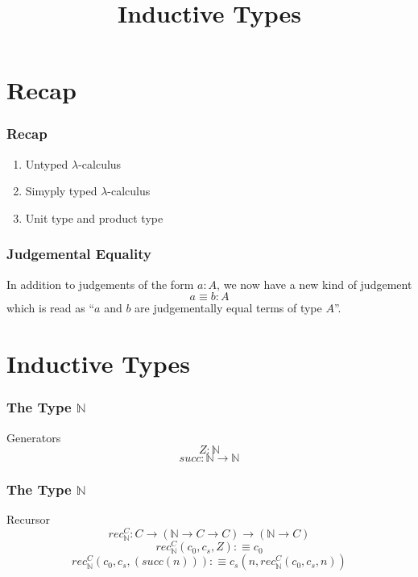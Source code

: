 \documentclass[14pt,compress]{beamer}
\title{Inductive Types}
\date{}
\newcommand{\N}{\mathbb{N}}
\begin{document}
\begin{frame}\label{frame : titlepage}
\titlepage
\end{frame}

\section{Recap}
\begin{frame}\label{frame : recap}
\frametitle{Recap}
\begin{enumerate}
\item Untyped $\lambda$-calculus
\item Simyply typed $\lambda$-calculus
\item Unit type and product type
\end{enumerate}
\end{frame}

\begin{frame}\label{frame : judgemental equality}
\frametitle{Judgemental Equality}

In addition to judgements of the form $a : A$, we now have a new kind of judgement
\textcolor{beamer@mathtext}{
\[ a \equiv b : A \]}
\noindent which is read as
\textcolor{beamer@mathtext}{``$a$ and $b$ are judgementally equal terms of type $A$''}.

\end{frame}

\section{Inductive Types}
\begin{frame}\label{frame : gen of Nat}
\frametitle{The Type $\mathbb{N}$}


\begin{block}{Generators}
\textcolor{beamer@mathtext}{
\[ Z : \N \]
\[ succ : \N \to \N \]}
\end{block}
\end{frame}

\begin{frame}\label{frame : rec of Nat}
\frametitle{The Type $\mathbb{N}$}

\begin{block}{Recursor}
\textcolor{beamer@mathtext}{
\[ rec_{\N}^C : C \to (\N \to C \to C) \to (\N \to C) \]
\[ rec_{\N}^C (c_0,c_s,Z) :\equiv c_0 \]
\[ rec_{\N}^C (c_0,c_s,(succ(n))) :\equiv c_s(n, rec_{\N}^C(c_0,c_s,n)) \]}
\end{block}
\end{frame}
\end{document}
